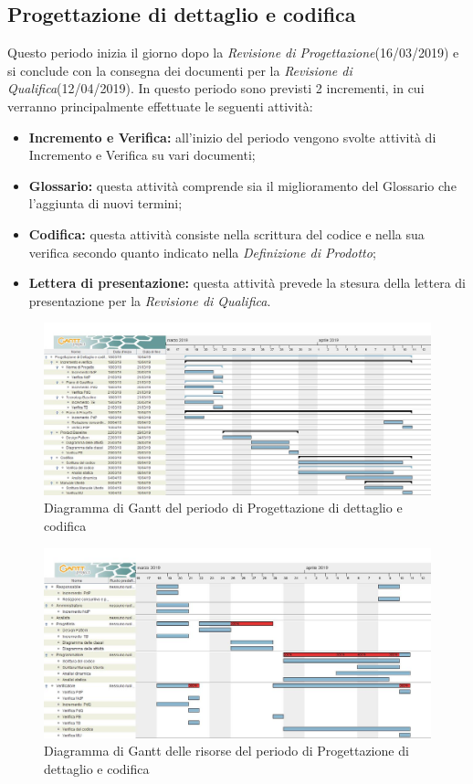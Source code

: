 \subsection{Progettazione di dettaglio e codifica}
Questo periodo inizia il giorno dopo la \textit{Revisione di Progettazione}(16/03/2019) e si conclude
con la consegna dei documenti per la \textit{Revisione di Qualifica}(12/04/2019). \newline
In questo periodo sono previsti 2 incrementi, in cui verranno principalmente effettuate le seguenti attività:
\begin{itemize}
	\item{\textbf{Incremento e Verifica:} all’inizio del periodo vengono svolte attività di Incremento e Verifica su vari documenti;}
	\item{\textbf{Glossario:} questa attività comprende sia il miglioramento del Glossario che l’aggiunta di nuovi termini;}
	\item{\textbf{Codifica:} questa attività consiste nella scrittura del codice e nella sua verifica secondo quanto indicato nella \textit{Definizione di Prodotto};}
	\item{\textbf{Lettera di presentazione:} questa attività prevede la stesura della lettera di presentazione per la \textit{Revisione di Qualifica}.}
\end{itemize}

\clearpage
\begin{figure}[!htpb]
	\centering
	\includegraphics[width=\textwidth]{Gantt_terza_fase.jpg}
	\caption{Diagramma di Gantt del periodo di Progettazione di dettaglio e codifica}
\end{figure}

\begin{figure}[!htpb]
	\centering
	\includegraphics[width=\textwidth]{Gantt_terza_fase_risorse.jpg}
	\caption{Diagramma di Gantt delle risorse del periodo di Progettazione di dettaglio e codifica}
\end{figure}

